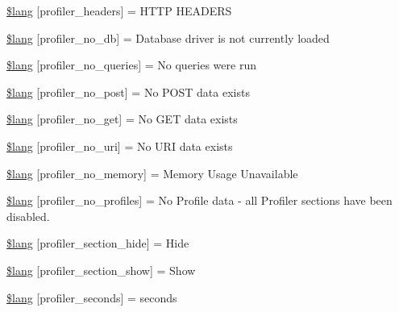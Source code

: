 \begin{DoxyCompactItemize}
\item 
\mbox{\hyperlink{profiler__lang_8php_ac0fc73cbb5ca9822333fda5adde092e0}{\$lang}} \mbox{[}\textquotesingle{}profiler\+\_\+headers\textquotesingle{}\mbox{]} = \textquotesingle{}H\+T\+TP H\+E\+A\+D\+E\+RS\textquotesingle{}
\item 
\mbox{\hyperlink{profiler__lang_8php_ae2c683baf06544290071fc1f875ba434}{\$lang}} \mbox{[}\textquotesingle{}profiler\+\_\+no\+\_\+db\textquotesingle{}\mbox{]} = \textquotesingle{}Database driver is not currently loaded\textquotesingle{}
\item 
\mbox{\hyperlink{profiler__lang_8php_a37bca6d1ba6d71e435408efec9752a27}{\$lang}} \mbox{[}\textquotesingle{}profiler\+\_\+no\+\_\+queries\textquotesingle{}\mbox{]} = \textquotesingle{}No queries were run\textquotesingle{}
\item 
\mbox{\hyperlink{profiler__lang_8php_a1214a1b3e1f77a8526c504bf5cd3342f}{\$lang}} \mbox{[}\textquotesingle{}profiler\+\_\+no\+\_\+post\textquotesingle{}\mbox{]} = \textquotesingle{}No P\+O\+ST data exists\textquotesingle{}
\item 
\mbox{\hyperlink{profiler__lang_8php_a40def9fbdbb2da118999453440df496f}{\$lang}} \mbox{[}\textquotesingle{}profiler\+\_\+no\+\_\+get\textquotesingle{}\mbox{]} = \textquotesingle{}No G\+ET data exists\textquotesingle{}
\item 
\mbox{\hyperlink{profiler__lang_8php_a8768b2e35912324d82232d0755680e51}{\$lang}} \mbox{[}\textquotesingle{}profiler\+\_\+no\+\_\+uri\textquotesingle{}\mbox{]} = \textquotesingle{}No U\+RI data exists\textquotesingle{}
\item 
\mbox{\hyperlink{profiler__lang_8php_a581928901340bb21ebe17aa379f6bad9}{\$lang}} \mbox{[}\textquotesingle{}profiler\+\_\+no\+\_\+memory\textquotesingle{}\mbox{]} = \textquotesingle{}Memory Usage Unavailable\textquotesingle{}
\item 
\mbox{\hyperlink{profiler__lang_8php_ab25c3da98f122cea8cb1ea55bc079cf1}{\$lang}} \mbox{[}\textquotesingle{}profiler\+\_\+no\+\_\+profiles\textquotesingle{}\mbox{]} = \textquotesingle{}No Profile data -\/ all Profiler sections have been disabled.\textquotesingle{}
\item 
\mbox{\hyperlink{profiler__lang_8php_ae5d6115438d89bcee0eb0f9bb00907ae}{\$lang}} \mbox{[}\textquotesingle{}profiler\+\_\+section\+\_\+hide\textquotesingle{}\mbox{]} = \textquotesingle{}Hide\textquotesingle{}
\item 
\mbox{\hyperlink{profiler__lang_8php_a5874df6015d4fe672d5514b9d1abbd1d}{\$lang}} \mbox{[}\textquotesingle{}profiler\+\_\+section\+\_\+show\textquotesingle{}\mbox{]} = \textquotesingle{}Show\textquotesingle{}
\item 
\mbox{\hyperlink{profiler__lang_8php_af3fde3c90349310ae9e26bf63fb06b78}{\$lang}} \mbox{[}\textquotesingle{}profiler\+\_\+seconds\textquotesingle{}\mbox{]} = \textquotesingle{}seconds\textquotesingle{}
\end{DoxyCompactItemize}


